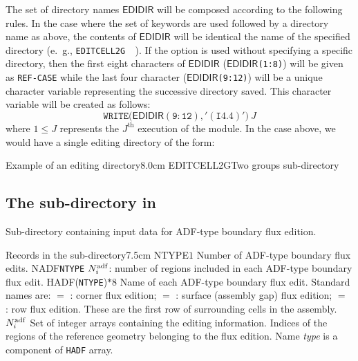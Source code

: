 The set of directory  names $\mathsf{EDIDIR}$ will be composed according to the
following rules. In the case where the set of keywords 
 are used followed by a directory name as above, the contents of
$\mathsf{EDIDIR}$ will be identical the name of the specified directory
(e.~g., \verb*|EDITCELL2G  |). If the  option is used without specifying a specific
directory, then the first eight characters of $\mathsf{EDIDIR}$ ($\mathsf{EDIDIR}$\verb*|(1:8)|)
will be given as
\verb*|REF-CASE| while the last four character ($\mathsf{EDIDIR}$\verb*|(9:12)|) will be a
unique character variable representing the successive directory saved. This character variable will
be created as follows:
\vskip -0.1cm
$$
\mathtt{WRITE(}\mathsf{EDIDIR}\mathtt{(9:12),'(I4.4)')}\: J
$$
\vskip -0.1cm
where $1\leq J $ represents the $J^{\textrm{th}}$ execution of the  module. In the case
above, we would have a single editing directory of the form: 

\begin{DescriptionEnregistrement}{Example of an editing directory}{8.0cm}
\DirEnr
  {EDITCELL2G}{Two groups  sub-directory}
\end{DescriptionEnregistrement}

\goodbreak

\subsection{The  sub-directory in }\label{sect:editionADF}

Sub-directory containing input data for ADF-type boundary flux edition.

\begin{DescriptionEnregistrement}{Records in the  sub-directory}{7.5cm}
\IntEnr
  {NTYPE}{$1$}
  {Number of ADF-type boundary flux edits.}
\IntEnr
  {NADF}{\tt NTYPE}
  {$N^{\rm adf}_i$: number of regions included in each ADF-type boundary flux edit.}
\CharEnr
  {HADF}{({\tt NTYPE})$*8$}
  {Name of each ADF-type boundary flux edit. Standard names are: $=$ :
corner flux edition; $=$ : surface (assembly gap) flux edition; $=$ :
row flux edition. These are the first row of surrounding cells in the assembly.}
\IntVar
  {}{$N^{\rm adf}_i$}
  {Set of integer arrays containing the editing information. Indices of the regions of the reference geometry belonging to the
  flux edition. Name {\sl type} is a component of {\tt HADF} array.}
\end{DescriptionEnregistrement}

\clearpage
